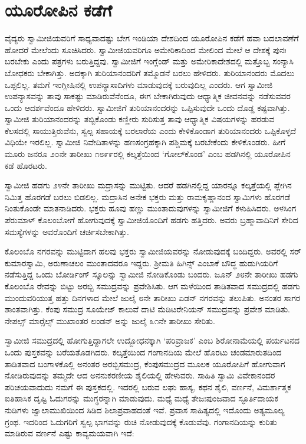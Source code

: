 
\chapter{ಯೂರೋಪಿನ ಕಡೆಗೆ  }

 ವೈದ್ಯರು ಸ್ವಾಮೀಜಿಯವರಿಗೆ ಸಾಧ್ಯವಾದಷ್ಟು ಬೇಗ ಇಂಡಿಯಾ ದೇಶದಿಂದ ಯೂರೋಪಿನ ಕಡೆಗೆ ಹವಾ ಬದಲಾವಣೆಗೆ ಹೋದರೆ ಮೇಲೆಂದು ಸೂಚಿಸಿದರು. ಸ್ವಾಮೀಜಿಯವರಿಗೂ ಅಮೇರಿಕಾದಿಂದ ಮೇಲಿಂದ ಮೇಲೆ ಆ ದೇಶಕ್ಕೆ ಪುನಃ ಬರಬೇಕು ಎಂದು ಪತ್ರಗಳು ಬರುತ್ತಿದ್ದವು. ಸ್ವಾಮೀಜಿಗೆ ಇಂಗ್ಲೆಂಡ್ ಮತ್ತು ಅಮೇರಿಕಾದೇಶದಲ್ಲಿ ಮತ್ತೊಬ್ಬ ಸಂನ್ಯಾಸಿ ಬೋಧಕರು ಬೇಕಾಗಿತ್ತು. ಅದಕ್ಕಾಗಿ ತುರಿಯಾನಂದರಿಗೆ ತಮ್ಮೊಡನೆ ಬರಲು ಹೇಳಿದರು. ತುರಿಯಾನಂದರು ಮೊದಲು ಒಪ್ಪಲಿಲ್ಲ. ತಮಗೆ ಇಂಗ್ಲೀಷಿನಲ್ಲಿ ಉಪನ್ಯಾಸಾದಿಗಳು ಮಾಡುವುದಕ್ಕೆ ಬರುವುದಿಲ್ಲ ಎಂದರು. ಆಗ ಸ್ವಾಮೀಜಿ ಉಪನ್ಯಾಸವನ್ನು ತಾವು ಸಾಕಷ್ಟು ಮಾಡಿರುವೆನೆಂದೂ, ಈಗ ಬೇಕಾಗಿರುವುದು ಆಧ್ಯಾತ್ಮಿಕ ಜೀವನವನ್ನು ನಡೆಸುವವರ ಒಂದು ಆದರ್ಶವೆಂದೂ ಹೇಳಿದರು. ಸ್ವಾಮೀಜಿಗೆ ತುರಿಯಾನಂದರನ್ನು ಒಪ್ಪಿಸುವುದೇ ಒಂದು ದೊಡ್ಡ ಕಷ್ಟವಾಗಿತ್ತು. ಸ್ವಾಮೀಜಿ ತುರಿಯಾನಂದರನ್ನು ತಬ್ಬಿಕೊಂಡು ಕಣ್ಣೀರು ಸುರಿಸುತ್ತ ತಾವು ಆಧ್ಯಾತ್ಮಿಕ ವಿಷಯಗಳನ್ನು ಹರಡುವ ಕೆಲಸದಲ್ಲಿ ಸಾಯುತ್ತಿರುವೆನು, ಸ್ವಲ್ಪ ಸಹಾಯಕ್ಕೆ ಬರಲಾರೆಯ ಎಂದು ಕೇಳಿಕೊಂಡಾಗ ತುರಿಯಾನಂದರು ಒಪ್ಪಿಕೊಳ್ಳದೆ ವಿಧಿಯೇ ಇರಲಿಲ್ಲ. ಸ್ವಾಮೀಜಿ ನಿವೇದಿತಾಳನ್ನು ಹಣಸಂಗ್ರಹಕ್ಕಾಗಿ ಪಶ್ಚಿಮಕ್ಕೆ ಬರಬೇಕೆಂದು ಕೇಳಿಕೊಂಡರು. ಹೀಗೆ ಮೂರು ಜನರೂ ೨೦ನೇ ತಾರೀಖು ೧೮೯೯ರಲ್ಲಿ ಕಲ್ಕತ್ತೆಯಿಂದ ‘ಗೋಲ್‍ಕೊಂಡ’ ಎಂಬ ಹಡಗಿನಲ್ಲಿ ಯೂರೋಪಿನ ಕಡೆ ಹೊರಟರು. 

 ಸ್ವಾಮೀಜಿ ಹಡಗು ೨೪ನೇ ತಾರೀಖು ಮದ್ರಾಸನ್ನು ಮುಟ್ಟಿತು. ಆದರೆ ಹಡಗಿನಲ್ಲಿದ್ದ ಯಾರನ್ನೂ ಕಲ್ಕತ್ತೆಯಲ್ಲಿ ಪ್ಲೇಗಿನ ನಿಮಿತ್ತ ಹೊರಗಡೆ ಬರಲು ಬಿಡಲಿಲ್ಲ. ಮದ್ರಾಸಿನ ಅನೇಕ ಭಕ್ತರು ಮತ್ತು ರಾಮಕೃಷ್ಣಾನಂದ ಸ್ವಾಮಿಗಳು ಹೊರಗಡೆ ನಿಂತುಕೊಂಡೇ ಮಾತನಾಡಿದರು. ಭಕ್ತರು ಹೂವು ಹಣ್ಣು ಮುಂತಾದುವುಗಳನ್ನು ಸ್ವಾಮೀಜಿಗೆ ಕಳುಹಿಸಿದರು. ಅಳಸಿಂಗ ಪೆರುಮಾಳ್ ಕೊಲಂಬೋಗೆ ಹೋಗುವುದಕ್ಕೆ ಸ್ವಾಮೀಜಿಯೊಂದಿಗೆ ಹಡಗು ಹತ್ತಿದರು. ಅವರು ಬ್ರಹ್ಮಾವಾದಿನಿಗೆ ಸೇರಿದ ಸಮಸ್ಯೆಗಳನ್ನು ಅವರೊಂದಿಗೆ ಚರ್ಚಿಸಬೇಕಾಗಿತ್ತು. 

 ಕೊಲಂಬೊ ನಗರವನ್ನು ಮುಟ್ಟಿದಾಗ ಹಲವು ಭಕ್ತರು ಸ್ವಾಮೀಜಿಯವರನ್ನು ನೋಡುವುದಕ್ಕೆ ಬಂದಿದ್ದರು. ಅವರಲ್ಲಿ ಸರ್ ಕುಮಾರಸ್ವಾಮಿ, ಅರುಣಾಚಲಂ ಮುಂತಾದವರೂ ಇದ್ದರು. ಶ‍್ರೀಮತಿ ಹಿಗಿನ್ಸ್ ಎಂಬಾಕೆ ಬೌದ್ಧ ಹುಡುಗಿಯರಿಗೆ ನಡೆಸುತ್ತಿದ್ದ ಒಂದು ಬೋರ್ಡಿಂಗ್ ಸ್ಕೂಲನ್ನು ಸ್ವಾಮೀಜಿ ನೋಡಿಕೊಂಡು ಬಂದರು. ಜೂನ್ ೨೮ನೇ ತಾರೀಖು ಹಡಗು ಕೊಲಂಬೊ ರೇವನ್ನು ಬಿಟ್ಟು ಅರಬ್ಬಿ ಸಮುದ್ರವನ್ನು ಪ್ರವೇಶಿಸಿತು. ಆಗ ಮಳೆಯಿಂದ ತಾಡಿತವಾದ ಸಮುದ್ರದಲ್ಲಿ ಹಡಗು ಮುಂದುವರಿಯುತ್ತ ಹತ್ತು ದಿನಗಳಾದ ಮೇಲೆ ಜುಲೈ ೮ನೇ ತಾರೀಖು ಏಡನ್ ನಗರವನ್ನು ತಲುಪಿತು. ಅನಂತರ ಸಾಗರ ಶಾಂತವಾಗಿತ್ತು. ಕೆಂಪು ಸಮುದ್ರ ಸೂಯೇಜ್ ಕಾಲುವೆ ದಾಟಿ ಮೆಡಿಟರೇನಿಯನ್ ಸಮುದ್ರವನ್ನು ಪ್ರವೇಶ ಮಾಡಿತು. ನೇಪಲ್ಸ್ ಮಾರ್‍ಸೆಲ್ಸ್ ಮುಖಾಂತರ ಲಂಡನ್ ಅನ್ನು ಜುಲೈ ೩೧ನೇ ತಾರೀಖು ಸೇರಿತು. 

 ಸ್ವಾಮೀಜಿ ಸಮುದ್ರದಲ್ಲಿ ಹೋಗುತ್ತಿದ್ದಾಗಲೇ ಉದ್ಬೋಧನಕ್ಕಾಗಿ ‘ಪರಿವ್ರಾಜಕ’ ಎಂಬ ಶಿರೋನಾಮೆಯಲ್ಲಿ ಪರ್ಯಟನದ ಒಂದು ಪುಸ್ತಕವನ್ನು ಬರೆಯತೊಡಗಿದರು. ಕಲ್ಕತ್ತೆಯಿಂದ ಗಂಗಾನದಿಯ ಮೇಲೆ ಹೊರಟು ಚಂಡಮಾರುತದಿಂದ ತಾಡಿತವಾದ ಬಂಗಾಳಕೊಲ್ಲಿ ಅನಂತರ ಅರಬ್ಬಿಸಮುದ್ರ, ಕೆಂಪುಸಮುದ್ರದ ಮೂಲಕ ಯೂರೋಪಿಗೆ ಹೋಗುವಾಗ ನೋಡಿರುವುದನ್ನು ತಮ್ಮದೇ ಆದ ಅನನುಕರಣೀಯ ಶೈಲಿಯಲ್ಲಿ ಹೇಳುವರು. ಸಾಹಿತಿ ಸ್ವಾಮಿ ವಿವೇಕಾನಂದರ ಪರಿಚಯವಾದುದು ನಮಗೆ ಈ ಪುಸ್ತಕದಲ್ಲಿ. ಇದರಲ್ಲಿ ಬರುವ ಲಘು ಹಾಸ್ಯ, ಕಥನ ಶೈಲಿ, ವರ್ಣನೆ, ವಿಮರ್ಶಾತ್ಮಕ ಐತಿಹಾಸಿಕ ದೃಷ್ಟಿ ಓದುಗರನ್ನು ಮುಗ್ಧರನ್ನಾಗಿ ಮಾಡುವುದು. ಮಧ್ಯೆ ಮಧ್ಯೆ ತೇಜಃಪುಂಜವಾದ ಸ್ಫೂರ್ತಿದಾಯಕ ನುಡಿಗಳು ಜ್ವಾಲಾಮುಖಿಯಿಂದ ಸಿಡಿದ ಶಿಲಾಪ್ರವಾಹದಂತೆ ಇವೆ. ಪ್ರವಾಸ ಸಾಹಿತ್ಯದಲ್ಲಿ ಇದೊಂದು ಅತ್ಯಮೂಲ್ಯ ಗ್ರಂಥ. ಇದರಿಂದ ಓದುಗರಿಗೆ ಸ್ವಲ್ಪ ಭಾಗವನ್ನು ರುಚಿ ನೋಡುವುದಕ್ಕೆ ಕೊಡುವೆವು. ಗಂಗಾನದಿಯನ್ನು ಕುರಿತು ಮಾಡಿರುವ ವರ್ಣನೆ ಎಷ್ಟು ಕಾವ್ಯಮಯವಾಗಿ ಇದೆ: 

